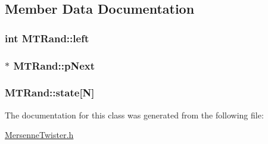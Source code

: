 \subsection{Member Data Documentation}
\hypertarget{classMTRand_a98eabf568c88f121e44f487397f32495}{
\subsubsection[{left}]{\setlength{\rightskip}{0pt plus 5cm}int {\bf MTRand::left}}}
\label{classMTRand_a98eabf568c88f121e44f487397f32495}
\hypertarget{classMTRand_a2b80858137c88fe69d4d2bdc665bcf93}{
\subsubsection[{pNext}]{$\ast$ {\bf MTRand::pNext}}}
\label{classMTRand_a2b80858137c88fe69d4d2bdc665bcf93}
\hypertarget{classMTRand_a2c87f537429bf0b0f6a452c22b9eebba}{
\subsubsection[{state}]{ {\bf MTRand::state}\mbox{[}N\mbox{]}}}
\label{classMTRand_a2c87f537429bf0b0f6a452c22b9eebba}


The documentation for this class was generated from the following file:\begin{DoxyCompactItemize}
\item 
\hyperlink{MersenneTwister_8h}{MersenneTwister.h}\end{DoxyCompactItemize}
